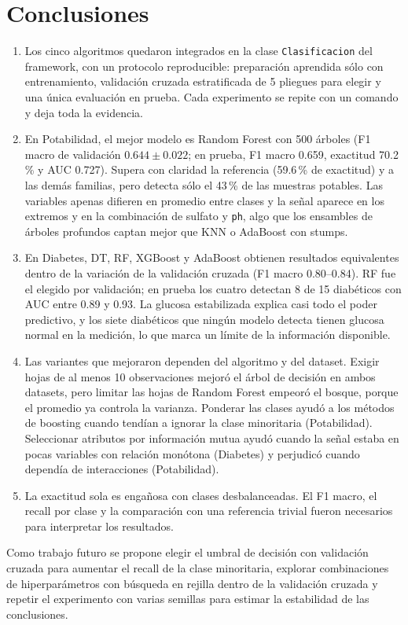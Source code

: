 \section{Conclusiones}

\begin{enumerate}
\item Los cinco algoritmos quedaron integrados en la clase \texttt{Clasificacion} del
framework, con un protocolo reproducible: preparación aprendida sólo con
entrenamiento, validación cruzada estratificada de 5 pliegues para elegir y una única
evaluación en prueba. Cada experimento se repite con un comando y deja toda la evidencia.

\item En Potabilidad, el mejor modelo es Random Forest con 500 árboles (F1 macro de
validación $0.644\pm0.022$; en prueba, F1 macro 0.659, exactitud 70.2\,\% y AUC 0.727).
Supera con claridad la referencia (59.6\,\% de exactitud) y a las demás familias, pero
detecta sólo el 43\,\% de las muestras potables. Las variables apenas difieren en
promedio entre clases y la señal aparece en los extremos y en la combinación de sulfato
y \texttt{ph}, algo que los ensambles de árboles profundos captan mejor que KNN o
AdaBoost con stumps.

\item En Diabetes, DT, RF, XGBoost y AdaBoost obtienen resultados equivalentes dentro de
la variación de la validación cruzada (F1 macro 0.80--0.84). RF fue el elegido por
validación; en prueba los cuatro detectan 8 de 15 diabéticos con AUC entre 0.89 y 0.93.
La glucosa estabilizada explica casi todo el poder predictivo, y los siete diabéticos
que ningún modelo detecta tienen glucosa normal en la medición, lo que marca un límite
de la información disponible.

\item Las variantes que mejoraron dependen del algoritmo y del dataset. Exigir hojas de al menos
10 observaciones mejoró el árbol de decisión en ambos datasets, pero limitar las hojas
de Random Forest empeoró el bosque, porque el promedio ya controla la varianza. Ponderar
las clases ayudó a los métodos de boosting cuando tendían a ignorar la clase minoritaria
(Potabilidad). Seleccionar atributos por información mutua ayudó
cuando la señal estaba en pocas variables con relación monótona (Diabetes) y perjudicó
cuando dependía de interacciones (Potabilidad).

\item La exactitud sola es engañosa con clases desbalanceadas. El F1 macro, el recall
por clase y la comparación con una referencia trivial fueron necesarios para interpretar
los resultados.
\end{enumerate}

Como trabajo futuro se propone elegir el umbral de decisión con validación cruzada para
aumentar el recall de la clase minoritaria, explorar combinaciones de hiperparámetros con
búsqueda en rejilla dentro de la validación cruzada y repetir el experimento con varias
semillas para estimar la estabilidad de las conclusiones.
